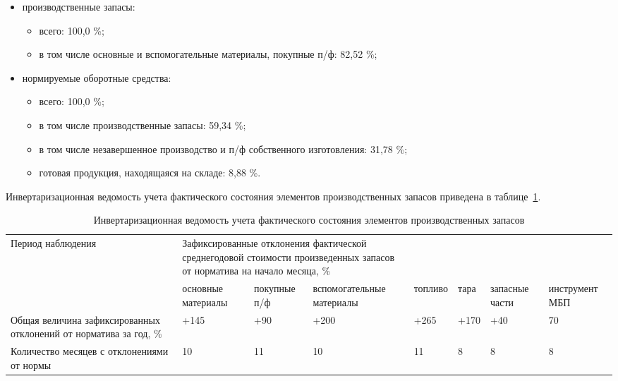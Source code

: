 \begin{itemize}
\item производственные запасы:
  \begin{itemize}
    \item всего: 100{,}0 \%;
    \item в том числе основные и вспомогательные материалы, 
      покупные п/ф: 82{,}52 \%;
  \end{itemize}
\item нормируемые оборотные средства:
  \begin{itemize}
    \item всего: 100{,}0 \%;
    \item в том числе производственные запасы: 59{,}34 \%;
    \item в том числе незавершенное производство и
      п/ф собственного изготовления: 31{,}78 \%;
    \item готовая продукция, находящаяся на складе: 8{,}88 \%.
  \end{itemize}
\end{itemize}

Инвертаризационная ведомость учета фактического состояния элементов 
производственных запасов приведена в таблице~\ref{tbl:source_real_state}.

\begin{table}[h!]
  \caption{Инвертаризационная ведомость учета фактического состояния элементов 
    производственных запасов}
  \label{tbl:source_real_state}
    \centering
    \small{
    \begin{tabular}{| p{} | p{} |
                      p{} | p{} | p{} |
                      p{} | p{} | p{} |}
      \hline
      Период \newline наблюдения 
      & \multicolumn{7}{|p{0.65\textwidth}|}{
        Зафиксированные отклонения фактической \newline
        среднегодовой стоимости произведенных запасов \newline
        от норматива на начало месяца, \%} \\ \cline{2-8}
      & основ\-ные материалы
      & покуп\-ные п/ф
      & вспомо\-гательные материалы
      & топ\-ливо
      & тара
      & запас\-ные части
      & инстру\-мент МБП \\ \hline

      Общая величина зафиксированных отклонений от норматива за год, \%
      & +145
      & +90
      & +200
      & +265
      & +170
      & +40
      & 70 \\ \hline

      Количество месяцев с отклонениями от нормы
      & 10
      & 11
      & 10
      & 11
      & 8
      & 8
      & 8 \\ \hline
    \end{tabular}
    }
\end{table}

